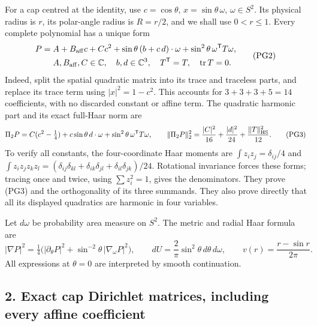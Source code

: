 \documentclass[11pt]{article}
\begin{document}
For a cap centred at the identity, use
\(c=\cos\theta\), \(x=\sin\theta\,\omega\), \(\omega\in S^2\).
Its physical radius is \(r\), its polar-angle radius is \(R=r/2\), and
we shall use \(0<r\le1\). Every complete polynomial has a unique form
\[
 \begin{aligned}
 P={}&A+B_{\rm aff} c+C c^2+\sin\theta\,(b+c\,d)\cdot\omega
           +\sin^2\theta\,\omega^{\mathsf T}T\omega,\\
 &A,B_{\rm aff},C\in\mathbb C,\quad b,d\in\mathbb C^3,\quad
 T^{\mathsf T}=T,\quad\operatorname{tr}T=0 .
 \end{aligned}\tag{PG2}
\]
Indeed, split the spatial quadratic matrix into its trace and traceless
parts, and replace its trace term using \(|x|^2=1-c^2\). This accounts
for \(3+3+3+5=14\) coefficients, with no discarded constant or affine term.
The quadratic harmonic part and its exact full-Haar norm are
\[
 \Pi_2P=C(c^2-\tfrac14)+c\sin\theta\,d\cdot\omega
                   +\sin^2\theta\,\omega^{\mathsf T}T\omega,\qquad
 \|\Pi_2P\|_2^2=\frac{|C|^2}{16}
                  +\frac{|d|^2}{24}+\frac{\|T\|_{\rm HS}^2}{12}.
 \tag{PG3}
\]
To verify all constants, the four-coordinate Haar moments are
\(\int z_i z_j=\delta_{ij}/4\) and
\(\int z_i z_jz_kz_l=
(\delta_{ij}\delta_{kl}+\delta_{ik}\delta_{jl}
+\delta_{il}\delta_{jk})/24\).
Rotational invariance forces these forms; tracing once and twice,
using \(\sum z_i^2=1\), gives the denominators. They prove (PG3)
and the orthogonality of its three summands. They also prove directly
that all its displayed quadratics are harmonic in four variables.

Let \(d\omega\) be probability area measure on \(S^2\). The metric and
radial Haar formula are
\[
 |\nabla P|^2=\tfrac14\bigl(|\partial_\theta P|^2+
                \sin^{-2}\theta\,|\nabla_\omega P|^2\bigr),\qquad
 dU=\frac2\pi\sin^2\theta\,d\theta\,d\omega,\qquad
 v(r)=\frac{r-\sin r}{2\pi}.
 \tag{PG4}
\]
All expressions at \(\theta=0\) are interpreted by smooth continuation.

\subsection*{2. Exact cap Dirichlet matrices, including every affine coefficient}
\end{document}
